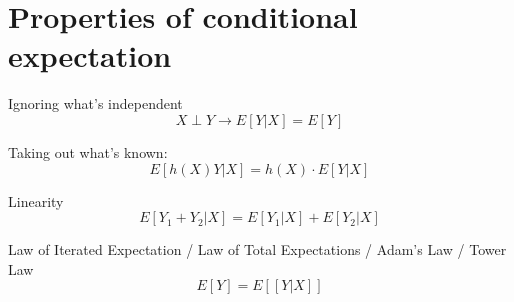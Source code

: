 \section{Properties of conditional expectation}
\begin{framed}
   Ignoring what's independent
   \[
      X \perp Y \rightarrow E[Y |X] = E[Y]
   \] 

   Taking out what's known: 
   \[
      E[h(X) Y |X] = h(X) \cdot E[Y |X]
   \] 

   Linearity
   \[
      E[Y_1 + Y_2 | X] = E[Y_1 | X] + E[Y_2 | X]
   \] 

   Law of Iterated Expectation / Law of Total Expectations / Adam's Law / Tower Law 
   \[
      E[Y] = E\left[[Y  |X] \right]
   \] 
  
\end{framed}


